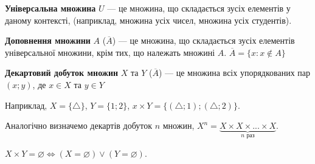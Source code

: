 \begin{definition}
    \textbf{Універсальна множина} $U$ --- це множина, що складається зусіх елементів
    у даному контексті, (наприклад, множина усіх чисел, множина усіх студентів).
\end{definition}

\begin{definition}
    \textbf{Доповнення множини} $A$ ($\overline{A}$) --- це множина, що складається зусіх елементів
    універсальної множини, крім тих, що належать множині $A$. $\overline{A} = \{x: x \notin A\}$
\end{definition}

\begin{definition}
    \textbf{Декартовий добуток множин} $X$ та $Y$ ($\overline{A}$) --- це множина всіх упорядкованих
    пар $(x;y)$, де $x \in X$ та $y \in Y$
\end{definition}

Наприклад, $X = \{\triangle\}$, $Y = \{1;2\}$, $x \times Y = \{(\triangle;1);(\triangle;2)\}$.

Аналогічно визначемо декартів добуток $n$ множин,
$X^n = \underbrace{X \times X \times ... \times X}\limits_{n\text{ раз}}$.

\begin{remark}
    $X \times Y = \varnothing \Leftrightarrow (X = \varnothing) \vee (Y = \varnothing)$.
\end{remark}

